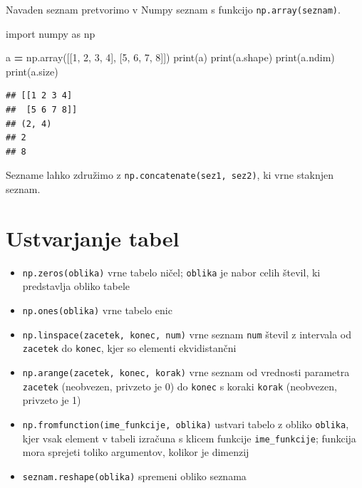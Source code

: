 \documentclass[
]{report}
\newenvironment{Shaded}{\begin{snugshade}}{\end{snugshade}}
\newcommand{\BuiltInTok}[1]{#1}
\newcommand{\DecValTok}[1]{\textcolor[rgb]{0.00,0.00,0.81}{#1}}
\newcommand{\ImportTok}[1]{#1}
\newcommand{\NormalTok}[1]{#1}
\newcommand{\OperatorTok}[1]{\textcolor[rgb]{0.81,0.36,0.00}{\textbf{#1}}}
\providecommand{\tightlist}{%
  \setlength{\itemsep}{0pt}\setlength{\parskip}{0pt}}
\begin{document}
Navaden seznam pretvorimo v Numpy seznam s funkcijo \texttt{np.array(seznam)}.

\begin{Shaded}
\begin{Highlighting}[]
\ImportTok{import}\NormalTok{ numpy }\ImportTok{as}\NormalTok{ np}

\NormalTok{a }\OperatorTok{=}\NormalTok{ np.array([[}\DecValTok{1}\NormalTok{, }\DecValTok{2}\NormalTok{, }\DecValTok{3}\NormalTok{, }\DecValTok{4}\NormalTok{], [}\DecValTok{5}\NormalTok{, }\DecValTok{6}\NormalTok{, }\DecValTok{7}\NormalTok{, }\DecValTok{8}\NormalTok{]])}
\BuiltInTok{print}\NormalTok{(a)}
\BuiltInTok{print}\NormalTok{(a.shape)}
\BuiltInTok{print}\NormalTok{(a.ndim)}
\BuiltInTok{print}\NormalTok{(a.size)}
\end{Highlighting}
\end{Shaded}

\begin{verbatim}
## [[1 2 3 4]
##  [5 6 7 8]]
## (2, 4)
## 2
## 8
\end{verbatim}

Sezname lahko združimo z \texttt{np.concatenate(sez1,\ sez2)}, ki vrne staknjen seznam.

\hypertarget{ustvarjanje-tabel}{%
\section{Ustvarjanje tabel}\label{ustvarjanje-tabel}}

\begin{itemize}
\tightlist
\item
  \texttt{np.zeros(oblika)} vrne tabelo ničel; \texttt{oblika} je nabor celih števil, ki predstavlja obliko tabele
\item
  \texttt{np.ones(oblika)} vrne tabelo enic
\item
  \texttt{np.linspace(zacetek,\ konec,\ num)} vrne seznam \texttt{num} števil z intervala od \texttt{zacetek} do \texttt{konec}, kjer so elementi ekvidistančni
\item
  \texttt{np.arange(zacetek,\ konec,\ korak)} vrne seznam od vrednosti parametra \texttt{zacetek} (neobvezen, privzeto je 0) do \texttt{konec} s koraki \texttt{korak} (neobvezen, privzeto je 1)
\item
  \texttt{np.fromfunction(ime\_funkcije,\ oblika)} ustvari tabelo z obliko \texttt{oblika}, kjer
  vsak element v tabeli izračuna s klicem funkcije \texttt{ime\_funkcije}; funkcija mora sprejeti toliko argumentov, kolikor je dimenzij
\item
  \texttt{seznam.reshape(oblika)} spremeni obliko seznama
\end{itemize}
\end{document}
